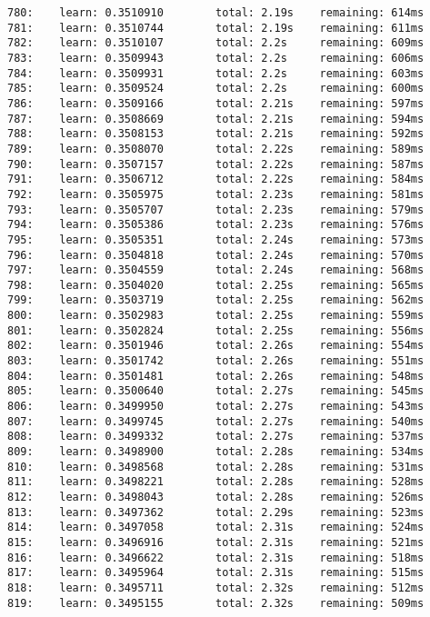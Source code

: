 \documentclass[11pt]{article}
\begin{document}
\begin{Verbatim}[commandchars=\\\{\}]
780:    learn: 0.3510910        total: 2.19s    remaining: 614ms
781:    learn: 0.3510744        total: 2.19s    remaining: 611ms
782:    learn: 0.3510107        total: 2.2s     remaining: 609ms
783:    learn: 0.3509943        total: 2.2s     remaining: 606ms
784:    learn: 0.3509931        total: 2.2s     remaining: 603ms
785:    learn: 0.3509524        total: 2.2s     remaining: 600ms
786:    learn: 0.3509166        total: 2.21s    remaining: 597ms
787:    learn: 0.3508669        total: 2.21s    remaining: 594ms
788:    learn: 0.3508153        total: 2.21s    remaining: 592ms
789:    learn: 0.3508070        total: 2.22s    remaining: 589ms
790:    learn: 0.3507157        total: 2.22s    remaining: 587ms
791:    learn: 0.3506712        total: 2.22s    remaining: 584ms
792:    learn: 0.3505975        total: 2.23s    remaining: 581ms
793:    learn: 0.3505707        total: 2.23s    remaining: 579ms
794:    learn: 0.3505386        total: 2.23s    remaining: 576ms
795:    learn: 0.3505351        total: 2.24s    remaining: 573ms
796:    learn: 0.3504818        total: 2.24s    remaining: 570ms
797:    learn: 0.3504559        total: 2.24s    remaining: 568ms
798:    learn: 0.3504020        total: 2.25s    remaining: 565ms
799:    learn: 0.3503719        total: 2.25s    remaining: 562ms
800:    learn: 0.3502983        total: 2.25s    remaining: 559ms
801:    learn: 0.3502824        total: 2.25s    remaining: 556ms
802:    learn: 0.3501946        total: 2.26s    remaining: 554ms
803:    learn: 0.3501742        total: 2.26s    remaining: 551ms
804:    learn: 0.3501481        total: 2.26s    remaining: 548ms
805:    learn: 0.3500640        total: 2.27s    remaining: 545ms
806:    learn: 0.3499950        total: 2.27s    remaining: 543ms
807:    learn: 0.3499745        total: 2.27s    remaining: 540ms
808:    learn: 0.3499332        total: 2.27s    remaining: 537ms
809:    learn: 0.3498900        total: 2.28s    remaining: 534ms
810:    learn: 0.3498568        total: 2.28s    remaining: 531ms
811:    learn: 0.3498221        total: 2.28s    remaining: 528ms
812:    learn: 0.3498043        total: 2.28s    remaining: 526ms
813:    learn: 0.3497362        total: 2.29s    remaining: 523ms
814:    learn: 0.3497058        total: 2.31s    remaining: 524ms
815:    learn: 0.3496916        total: 2.31s    remaining: 521ms
816:    learn: 0.3496622        total: 2.31s    remaining: 518ms
817:    learn: 0.3495964        total: 2.31s    remaining: 515ms
818:    learn: 0.3495711        total: 2.32s    remaining: 512ms
819:    learn: 0.3495155        total: 2.32s    remaining: 509ms

\end{Verbatim}
\end{document}
